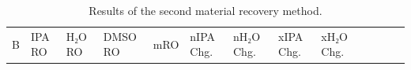 \begin{longtable}[]{@{}
  >{\raggedleft\arraybackslash}p{}
  >{\raggedleft\arraybackslash}p{}
  >{\raggedleft\arraybackslash}p{}
  >{\raggedleft\arraybackslash}p{}
  >{\raggedleft\arraybackslash}p{}
  >{\raggedleft\arraybackslash}p{}
  >{\raggedleft\arraybackslash}p{}
  >{\raggedleft\arraybackslash}p{}
  >{\raggedleft\arraybackslash}p{}
  >{\raggedleft\arraybackslash}p{}
  >{\raggedleft\arraybackslash}p{}
  >{\raggedleft\arraybackslash}p{}
  >{\raggedleft\arraybackslash}p{}@{}}
\caption{Results of the second material recovery method.
\label{tab:Results of the second material recovery method}}\tabularnewline
\toprule\noalign{}
\begin{minipage}[b]{\linewidth}\raggedleft
B
\end{minipage} & \begin{minipage}[b]{\linewidth}\raggedleft
IPA RO
\end{minipage} & \begin{minipage}[b]{\linewidth}\raggedleft
H₂O RO
\end{minipage} & \begin{minipage}[b]{\linewidth}\raggedleft
DMSO RO
\end{minipage} & \begin{minipage}[b]{\linewidth}\raggedleft
mRO
\end{minipage} & \begin{minipage}[b]{\linewidth}\raggedleft
nIPA Chg.
\end{minipage} & \begin{minipage}[b]{\linewidth}\raggedleft
nH₂O Chg.
\end{minipage} & \begin{minipage}[b]{\linewidth}\raggedleft
xIPA Chg.
\end{minipage} & \begin{minipage}[b]{\linewidth}\raggedleft
xH₂O Chg.
\end{minipage} & \begin{minipage}[b]{\linewidth}\raggedleft

\end{minipage}
\end{longtable}
